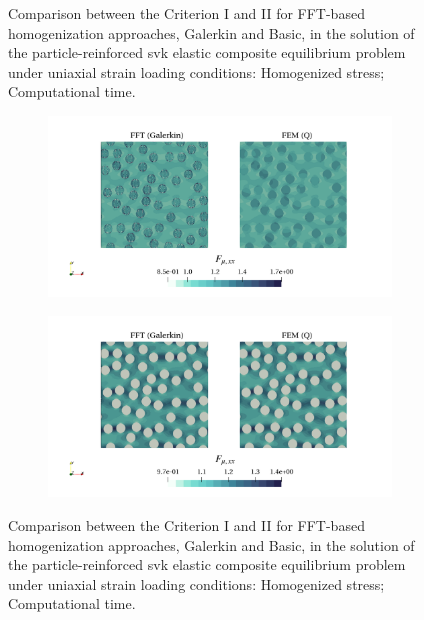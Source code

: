 \begin{figure}[hbt]
\begin{subfigure}[b]{0.49\textwidth}
    \caption{}
    \label{subfig:svk_2D_normal_stress_avg_cpu_time_vs_n_voxels}
  \end{subfigure}
\caption{Comparison between the Criterion I and II for FFT-based homogenization approaches, Galerkin and Basic, in the
solution of the particle-reinforced svk elastic composite equilibrium problem under uniaxial
strain loading conditions:  Homogenized stress;  Computational time.}
\label{fig:svk_3D_normal_comparison_crit}
\end{figure}

\begin{figure}[hbt]
\centering
	\begin{subfigure}[b]{\textwidth}
    \centering
    \includegraphics[width=\textwidth]{figures/svk_2D_ratio_-4_normal_strain_11}
    \caption{}
    \label{subfig:svk_2D_ratio_4_normal_strain_11}
  \end{subfigure}
  \begin{subfigure}[b]{\textwidth}
    \centering
    \includegraphics[width=\textwidth]{figures/svk_2D_ratio_4_normal_strain_11}
    \caption{}
    \label{subfig:svk_2D_ratio_-4_normal_strain_11}
  \end{subfigure}
\caption{Comparison between the Criterion I and II for FFT-based homogenization approaches, Galerkin and Basic, in the
solution of the particle-reinforced svk elastic composite equilibrium problem under uniaxial
strain loading conditions:  Homogenized stress;  Computational time.}
\label{fig:svk_3D_normal_comparison_crit}
\end{figure}

